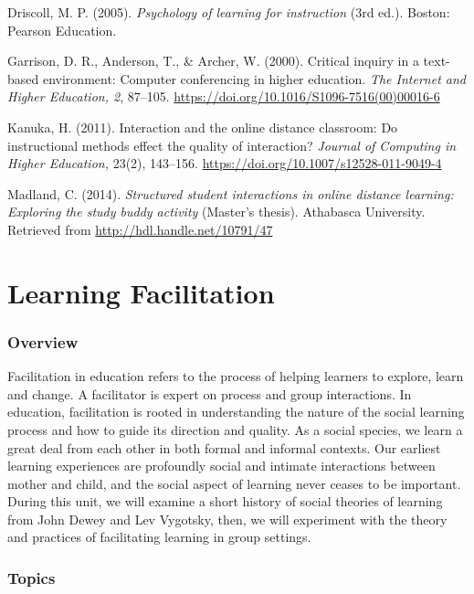 \documentclass[
]{book}
\begin{document}
Driscoll, M. P. (2005). \emph{Psychology of learning for instruction} (3rd ed.). Boston: Pearson Education.

Garrison, D. R., Anderson, T., \& Archer, W. (2000). Critical inquiry in a text-based environment: Computer conferencing in higher education. \emph{The Internet and Higher Education, 2}, 87--105. \url{https://doi.org/10.1016/S1096-7516(00)00016-6}

Kanuka, H. (2011). Interaction and the online distance classroom: Do instructional methods effect the quality of interaction? \emph{Journal of Computing in Higher Education,} 23(2), 143--156. \url{https://doi.org/10.1007/s12528-011-9049-4}

Madland, C. (2014). \emph{Structured student interactions in online distance learning: Exploring the study buddy activity} (Master's thesis). Athabasca University. Retrieved from \url{http://hdl.handle.net/10791/47}

\hypertarget{learning-facilitation}{%
\chapter{Learning Facilitation}\label{learning-facilitation}}

\hypertarget{overview-1}{%
\subsection*{Overview}\label{overview-1}}

Facilitation in education refers to the process of helping learners to explore, learn and change. A facilitator is expert on process and group interactions. In education, facilitation is rooted in understanding the nature of the social learning process and how to guide its direction and quality. As a social species, we learn a great deal from each other in both formal and informal contexts. Our earliest learning experiences are profoundly social and intimate interactions between mother and child, and the social aspect of learning never ceases to be important. During this unit, we will examine a short history of social theories of learning from John Dewey and Lev Vygotsky, then, we will experiment with the theory and practices of facilitating learning in group settings.

\hypertarget{topics-1}{%
\subsection*{Topics}\label{topics-1}}
\end{document}

